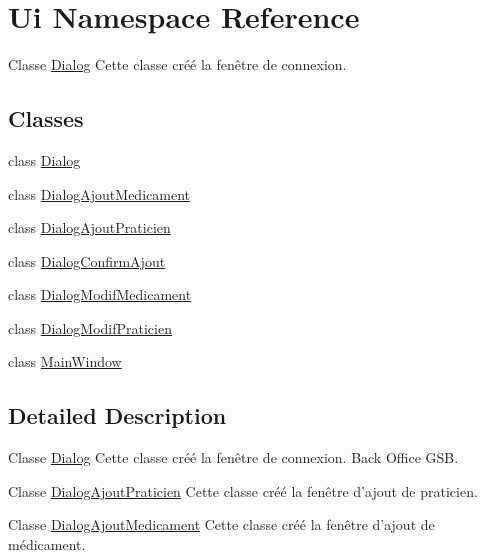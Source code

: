 \hypertarget{namespaceUi}{\section{Ui Namespace Reference}
\label{namespaceUi}
}


Classe \hyperlink{classUi_1_1Dialog}{Dialog} Cette classe créé la fenêtre de connexion.  


\subsection*{Classes}
\begin{DoxyCompactItemize}
\item 
class \hyperlink{classUi_1_1Dialog}{Dialog}
\item 
class \hyperlink{classUi_1_1DialogAjoutMedicament}{Dialog\-Ajout\-Medicament}
\item 
class \hyperlink{classUi_1_1DialogAjoutPraticien}{Dialog\-Ajout\-Praticien}
\item 
class \hyperlink{classUi_1_1DialogConfirmAjout}{Dialog\-Confirm\-Ajout}
\item 
class \hyperlink{classUi_1_1DialogModifMedicament}{Dialog\-Modif\-Medicament}
\item 
class \hyperlink{classUi_1_1DialogModifPraticien}{Dialog\-Modif\-Praticien}
\item 
class \hyperlink{classUi_1_1MainWindow}{Main\-Window}
\end{DoxyCompactItemize}


\subsection{Detailed Description}
Classe \hyperlink{classUi_1_1Dialog}{Dialog} Cette classe créé la fenêtre de connexion. Back Office G\-S\-B.

Classe \hyperlink{classUi_1_1DialogAjoutPraticien}{Dialog\-Ajout\-Praticien} Cette classe créé la fenêtre d'ajout de praticien.

Classe \hyperlink{classUi_1_1DialogAjoutMedicament}{Dialog\-Ajout\-Medicament} Cette classe créé la fenêtre d'ajout de médicament.


